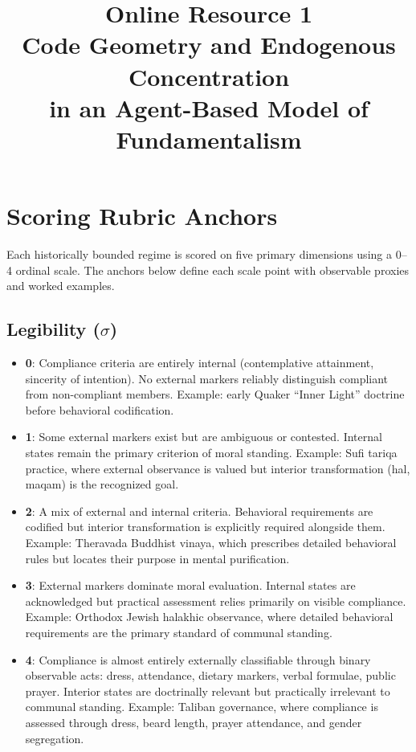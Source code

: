 \documentclass[12pt]{article}
\title{Online Resource 1\\[0.5em]
\large Code Geometry and Endogenous Concentration\\in an Agent-Based Model of Fundamentalism}
\author{}
\date{}
\begin{document}
\maketitle

\section{Scoring Rubric Anchors}

Each historically bounded regime is scored on five primary dimensions using a 0--4 ordinal scale. The anchors below define each scale point with observable proxies and worked examples.

\subsection{Legibility ($\sigma$)}

\begin{itemize}
\item \textbf{0}: Compliance criteria are entirely internal (contemplative attainment, sincerity of intention). No external markers reliably distinguish compliant from non-compliant members. Example: early Quaker ``Inner Light'' doctrine before behavioral codification.
\item \textbf{1}: Some external markers exist but are ambiguous or contested. Internal states remain the primary criterion of moral standing. Example: Sufi tariqa practice, where external observance is valued but interior transformation (hal, maqam) is the recognized goal.
\item \textbf{2}: A mix of external and internal criteria. Behavioral requirements are codified but interior transformation is explicitly required alongside them. Example: Theravada Buddhist vinaya, which prescribes detailed behavioral rules but locates their purpose in mental purification.
\item \textbf{3}: External markers dominate moral evaluation. Internal states are acknowledged but practical assessment relies primarily on visible compliance. Example: Orthodox Jewish halakhic observance, where detailed behavioral requirements are the primary standard of communal standing.
\item \textbf{4}: Compliance is almost entirely externally classifiable through binary observable acts: dress, attendance, dietary markers, verbal formulae, public prayer. Interior states are doctrinally relevant but practically irrelevant to communal standing. Example: Taliban governance, where compliance is assessed through dress, beard length, prayer attendance, and gender segregation.
\end{itemize}
\end{document}
